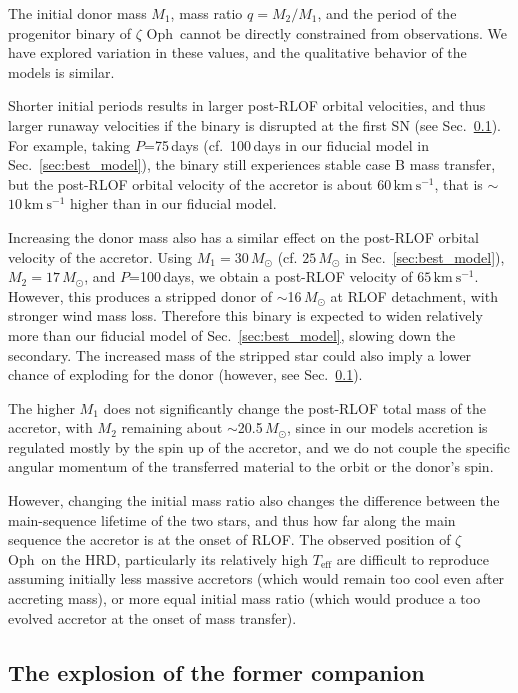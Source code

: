 \documentclass[twocolumn,twocolappendix,trackchanges]{aastex63}
\newcommand{\kms}{{\mathrm{km\ s^{-1}}}}
\DeclareRobustCommand{\Secref}[1]{Sec.~\ref{#1}}
\newcommand{\zoph}{$\zeta$ Oph}
\begin{document}
The initial donor mass $M_1$, mass ratio $q=M_2/M_1$, and the period of the progenitor binary of \zoph\ cannot be directly
constrained from observations. We have explored variation in these values, and the
qualitative behavior of the models is similar.

Shorter initial periods results in larger post-RLOF orbital
velocities, and thus larger runaway velocities if the binary is
disrupted at the first SN (see \Secref{sec:SN_comp}). For example, taking $P$=75\,days
(cf.~100\,days in our fiducial model in \Secref{sec:best_model}), the
binary still experiences stable case B mass transfer, but the
post-RLOF orbital velocity of the accretor is about $60\,\kms$, that
is $\sim$$10\,\kms$ higher
than in our fiducial model.

Increasing the donor mass also has a similar effect on the post-RLOF orbital velocity of the accretor. Using
$M_1=30\,M_\odot$ (cf.
$25\,M_\odot$ in \Secref{sec:best_model}),
$M_2=17\,M_\odot$, and
$P$=100\,days, we obtain a post-RLOF velocity of
$65\,\kms$. However, this produces a stripped donor of
$\sim$16\,$M_\odot$ at RLOF detachment, with stronger wind mass loss. Therefore this binary is expected to widen relatively more than our fiducial model of \Secref{sec:best_model}, slowing down the secondary. The increased mass of the stripped star could also imply a lower chance of exploding for the donor (however, see \Secref{sec:SN_comp}).

The higher $M_1$ does not significantly change the post-RLOF total
mass of the accretor, with $M_2$ remaining about $\sim$20.5\,$M_\odot$, since
in our models accretion is regulated mostly by the spin up of the
accretor, and we do not couple the specific angular momentum of the transferred
material to the orbit or the donor's spin.

However, changing the initial mass ratio also changes the difference
between the main-sequence lifetime of the two stars, and thus how far
along the main sequence the accretor is at the onset of RLOF. The observed
position of \zoph\ on the HRD, particularly its relatively high
$T_\mathrm{eff}$ are difficult to reproduce assuming initially less
massive accretors (which would remain too cool even after accreting
mass), or more equal initial mass ratio (which would produce a too
evolved accretor at the onset of mass transfer).

\subsection{The explosion of the former companion}
\label{sec:SN_comp}
\end{document}
